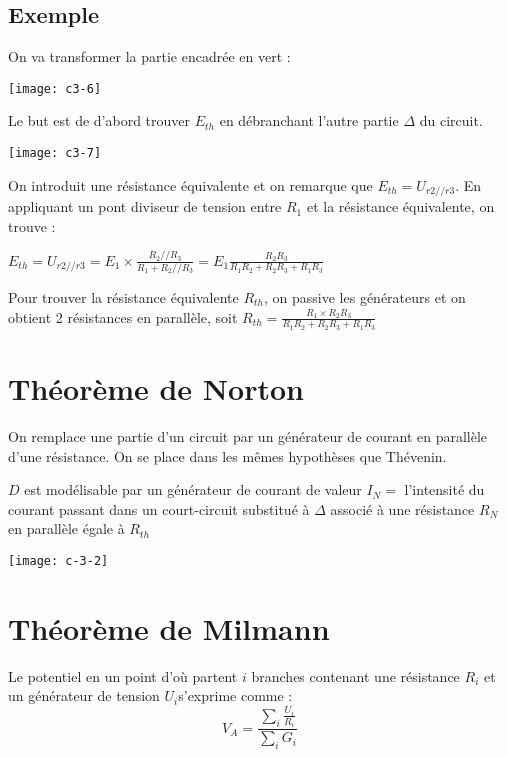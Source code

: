 \documentclass[french]{yLectureNote}
\begin{document}
\subsection{Exemple}
On va transformer la partie encadrée en vert :

\texttt{[image: c3-6]}

Le but est de d'abord trouver $E_{th}$ en débranchant l'autre partie $\Delta$ du circuit.

\texttt{[image: c3-7]}

On introduit une résistance équivalente et on remarque que $E_{th} = U_{r2//r3}$. En appliquant un pont diviseur de tension entre $R_1$ et la résistance équivalente, on trouve :

$E_{th} = U_{r2//r3} = E_1 \times \frac{R_2//R_3}{R_1+R_2//R_3} = E_1 \frac{R_2R_3}{R_1R_2+R_2R_3+R_1R_3}$

Pour trouver la résistance équivalente $R_{th}$, on passive les générateurs et on obtient 2 résistances en parallèle, soit $R_{th} = \frac{R_1\times R_2R_3}{R_1R_2+R_2R_3+R_1R_3}$

\section{Théorème de Norton}
On remplace une partie d'un circuit par un générateur de courant en parallèle d'une résistance. On se place dans les m\^emes hypothèses que Thévenin.
\begin{theorem}
 $D$ est modélisable par un générateur de courant de valeur $I_{N} = $ l'intensité du courant passant dans un court-circuit substitué à $\Delta$ associé à une résistance $R_{N}$ en parallèle égale à $R_{th}$
\end{theorem}
\texttt{[image: c-3-2]}
%

\section{Théorème de Milmann}
\begin{theorem}
 Le potentiel en un point d'où partent $i$ branches contenant une résistance \(R_i\) et un générateur de tension \(U_i\)s'exprime comme : \[V_A = \frac{\sum_i \frac{U_i}{R_i}}{\sum_i G_i}\]
\end{theorem}
\end{document}
